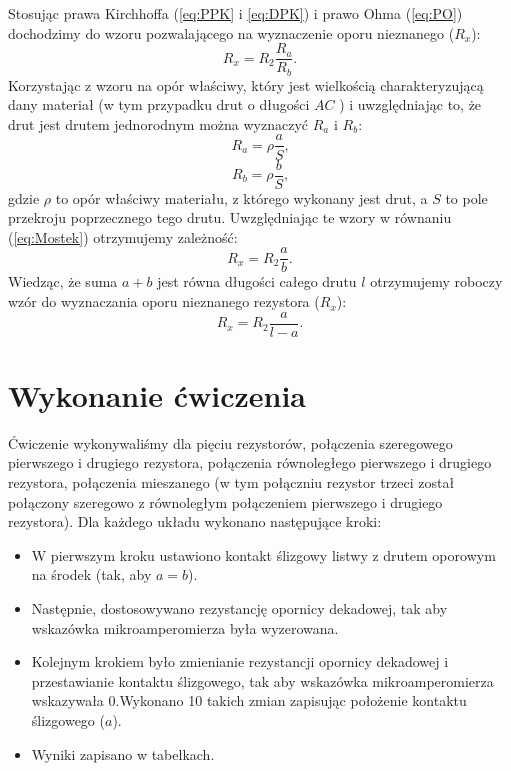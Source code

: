 \documentclass [a4paper,11pt]{article}
\begin{document}
	Stosując prawa Kirchhoffa (\ref{eq:PPK} i \ref{eq:DPK}) i prawo Ohma (\ref{eq:PO}) dochodzimy do wzoru pozwalającego na wyznaczenie oporu nieznanego ($R_x$):
	\begin{equation}
	\label{eq:Mostek}
	R_x=R_2\frac{R_a}{R_b}\text{.}
	\end{equation}
	Korzystając z wzoru na opór właściwy, który jest wielkością charakteryzującą dany materiał (w tym przypadku drut o długości $AC$ ) i uwzględniając to, że drut jest drutem jednorodnym można wyznaczyć $R_a$ i $R_b$:
	\begin{equation}
	\label{eq:Opór Ra}
	R_a=\rho \frac{a}{S}\text{,}
	\end{equation}
	\begin{equation}
	\label{eq:Opór Rb}
	R_b=\rho \frac{b}{S}\text{,}
	\end{equation}
	gdzie $\rho$ to opór właściwy materiału, z którego wykonany jest drut, a $S$ to pole przekroju poprzecznego tego drutu. Uwzględniając te wzory w równaniu (\ref{eq:Mostek}) otrzymujemy zależność: 
	\begin{equation}
	\label{eq:Mostek2}
	R_x=R_2\frac{a}{b}\text{.}
	\end{equation}
	Wiedząc, że suma $a+b$ jest równa długości całego drutu $l$ otrzymujemy roboczy wzór do wyznaczania oporu nieznanego rezystora ($R_x$):
	\begin{equation}
	\label{eq:MostekRoboczy}
	R_x=R_2\frac{a}{l-a}\text{.}
	\end{equation}
		
	\section{Wykonanie ćwiczenia}
	Ćwiczenie wykonywaliśmy dla pięciu rezystorów, połączenia szeregowego pierwszego i drugiego rezystora, połączenia równoległego pierwszego i drugiego rezystora, połączenia mieszanego (w tym połączniu rezystor trzeci został połączony szeregowo z równoległym połączeniem pierwszego i drugiego rezystora).
	Dla każdego układu wykonano następujące kroki:
	\begin{itemize}
		\item W pierwszym kroku ustawiono kontakt ślizgowy listwy z drutem oporowym na środek (tak, aby $a=b$).
		
		\item Następnie, dostosowywano rezystancję opornicy dekadowej, tak aby wskazówka mikroamperomierza była wyzerowana.
		
		\item Kolejnym krokiem było zmienianie rezystancji opornicy dekadowej i przestawianie kontaktu ślizgowego, tak aby wskazówka mikroamperomierza wskazywała 0.Wykonano 10 takich zmian zapisując położenie kontaktu ślizgowego ($a$).
		
		
		\item Wyniki zapisano w tabelkach.
	\end{itemize}
	\renewcommand*{\figurename}{Tabela} 
	\setcounter{figure}{0}
	
\end{document}
